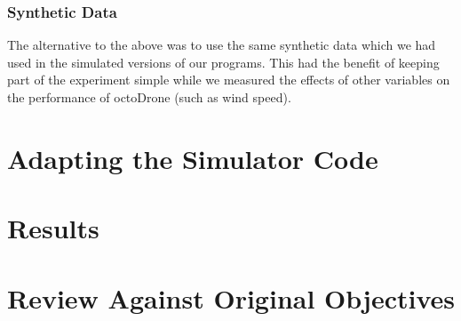 \subsubsection{Synthetic Data}
The alternative to the above was to use the same synthetic data which we had used in the simulated versions of our programs. This had the benefit of keeping part of the experiment simple while we measured the effects of other variables on the performance of octoDrone (such as wind speed).

\section{Adapting the Simulator Code}
\section{Results}
\section{Review Against Original Objectives}
